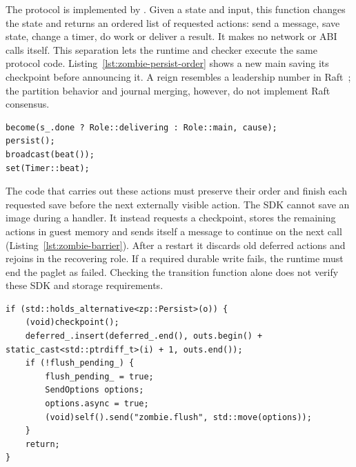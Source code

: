The protocol is implemented by
. Given a state and input, this
function changes the state and returns an ordered list of requested
actions: send a message, save state, change a timer, do work or deliver
a result. It makes no network or ABI calls itself. This separation lets
the runtime and checker execute the same protocol code.
Listing~\ref{lst:zombie-persist-order} shows a new main saving its
checkpoint before announcing it. A reign resembles a leadership number
in Raft~\cite{ongaro2014raft}; the partition behavior and journal merging,
however, do not implement Raft consensus.

\begin{lstlisting}[style=paglets-cpp,caption={Saving a new main's checkpoint before announcing it \src{cpp/common/include/paglets/protocols/zombie/zombie\_impl.hpp}},label={lst:zombie-persist-order}]
become(s_.done ? Role::delivering : Role::main, cause);
persist();
broadcast(beat());
set(Timer::beat);
\end{lstlisting}

The code that carries out these actions must preserve their order and
finish each requested save before the next externally visible action.
The SDK cannot save an image during a handler. It instead requests a
checkpoint, stores the remaining actions in guest memory and sends
itself a message to continue on the next call
(Listing~\ref{lst:zombie-barrier}). After a restart it discards old deferred
actions and rejoins in the recovering role. If a required durable write
fails, the runtime must end the paglet as failed. Checking the transition
function alone does not verify these SDK and storage requirements.

\begin{lstlisting}[style=paglets-cpp,caption={Saving a checkpoint before carrying out remaining actions \src{cpp/sdk/include/paglets/patterns/zombie.hpp}},label={lst:zombie-barrier}]
if (std::holds_alternative<zp::Persist>(o)) {
    (void)checkpoint();
    deferred_.insert(deferred_.end(), outs.begin() + static_cast<std::ptrdiff_t>(i) + 1, outs.end());
    if (!flush_pending_) {
        flush_pending_ = true;
        SendOptions options;
        options.async = true;
        (void)self().send("zombie.flush", std::move(options));
    }
    return;
}
\end{lstlisting}

